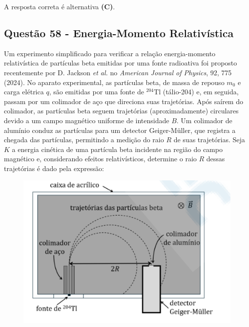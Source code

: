\documentclass[a4paper,12pt]{article}
\begin{document}
\begin{flushleft}
A resposta correta é alternativa \colorbox{green!50}{\textbf{(C)}}.

\end{flushleft}

\begin{flushleft}
\subsection{Quest\~ao 58 - Energia-Momento Relativística} 

Um experimento simplificado para verificar a relação energia-momento relativística de partículas beta emitidas por uma fonte radioativa foi 
proposto recentemente por D. Jackson \textit{et al.} no \textit{American Journal of Physics}, 92, 775 (2024). No aparato experimental, as 
partículas beta, de massa de repouso \(m_0\) e carga elétrica \(q\), são emitidas por uma fonte de \({}^{204}\mathrm{Tl}\) (tálio-204) e, 
em seguida, passam por um colimador de aço que direciona suas trajetórias. Após saírem do colimador, as partículas beta seguem trajetórias 
(aproximadamente) circulares devido a um campo magnético uniforme de intensidade \(B\). Um colimador de alumínio conduz as partículas para 
um detector Geiger-Müller, que registra a chegada das partículas, permitindo a medição do raio \(R\) de suas trajetórias. Seja \(K\) a energia 
cinética de uma partícula beta incidente na região do campo magnético e, considerando efeitos relativísticos, determine o raio \(R\) dessas trajetórias
\'e dado pela expressão:

\begin{figure}[!h]
  \centering
  \includegraphics[scale=0.6]{figures/energia-momento.png}
\end{figure}



\end{flushleft}
\end{document}
